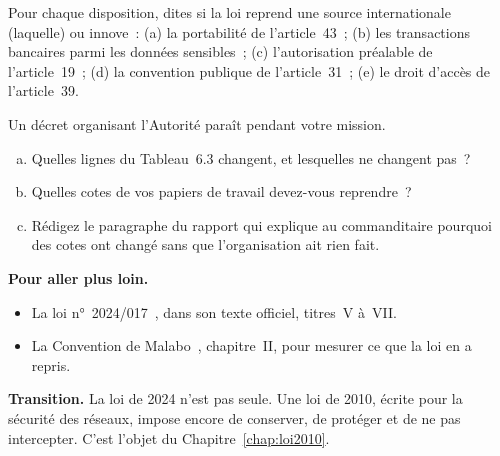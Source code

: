 \begin{boxexo}[title={\ding{45}\quad Exercice~6.3. Reprise ou ajout \niveaumoyen}]
Pour chaque disposition, dites si la loi reprend une source internationale
(laquelle) ou innove~: (a) la portabilité de l'article~43~; (b) les
transactions bancaires parmi les données sensibles~; (c) l'autorisation
préalable de l'article~19~; (d) la convention publique de l'article~31~;
(e) le droit d'accès de l'article~39.
\end{boxexo}

\begin{boxexo}[title={\ding{45}\quad Exercice~6.4. Le tableau des textes attendus \niveauexpert}]
Un décret organisant l'Autorité paraît pendant votre mission.
\begin{enumerate}[(a)]
    \item Quelles lignes du Tableau~6.3 changent, et lesquelles ne changent
          pas~?
    \item Quelles cotes \NEK{} de vos papiers de travail devez-vous
          reprendre~?
    \item Rédigez le paragraphe du rapport qui explique au commanditaire
          pourquoi des cotes ont changé sans que l'organisation ait rien
          fait.
\end{enumerate}
\end{boxexo}

\bigskip

\begin{boxinfo}
\textbf{Pour aller plus loin.}
\begin{itemize}
    \item La loi n°~2024/017~\cite{loi2024017}, dans son texte officiel,
          titres~V à~VII.
    \item La Convention de Malabo~\cite{ua2014malabo}, chapitre~II, pour
          mesurer ce que la loi en a repris.
\end{itemize}
\end{boxinfo}

\begin{boxinfo}
\textbf{Transition.} La loi de 2024 n'est pas seule. Une loi de 2010, écrite
pour la sécurité des réseaux, impose encore de conserver, de protéger et de
ne pas intercepter. C'est l'objet du Chapitre~\ref{chap:loi2010}.
\end{boxinfo}
